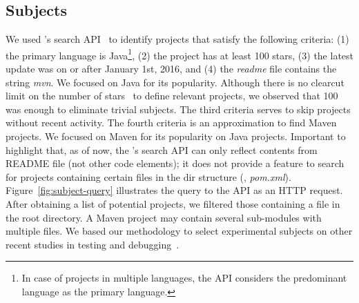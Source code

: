 

\subsection{Subjects}
\label{sec:subjects}



We used \github{}'s search API~\cite{githubsearch} to identify
projects that satisfy the following criteria: (1) the primary language
is Java\footnote{In case of projects in multiple languages, the
  \github{} API considers the predominant language as the primary
  language.}, (2) the project has at least 100 stars, (3) the latest
update was on or after January 1st, 2016, and (4) the \emph{readme}
file contains the string \emph{mvn}.  We focused on Java for its
popularity.  Although there is no clearcut limit on the number of
\github{} stars~\cite{github-stars} to define relevant projects, we
observed that 100 was enough to eliminate trivial subjects. The third
criteria serves to skip projects without recent activity. The fourth
criteria is an approximation to find Maven projects. We focused on Maven for its popularity on
Java projects.  Important to highlight that, as of now, the
\github{}'s search API can only reflect contents from README file (not
other code elements); it does not provide a feature to search for
projects containing certain files in the dir structure (\eg{},
\emph{pom.xml}).  Figure~\ref{fig:subject-query} illustrates the query
to the \github{} API as an HTTP request.  After obtaining a list of
potential projects, we filtered those containing a \pomf{} file in the
root directory.  A Maven project may contain several sub-modules with
multiple \pomf{} files.  We based our methodology to select
experimental subjects on other recent studies in testing and
debugging~\cite{gligoric-etal-issta2015,perez-etal-icst2017}.

